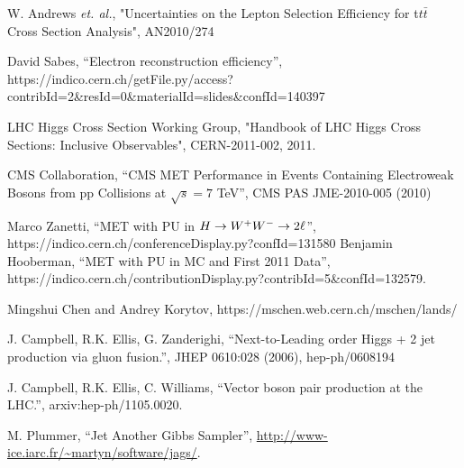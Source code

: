 W. Andrews {\it et. al.}, "Uncertainties on the Lepton Selection Efficiency for t$t\bar{t}$ Cross Section Analysis", AN2010/274

David Sabes, ``Electron reconstruction efficiency'', https://indico.cern.ch/getFile.py/access?contribId=2\&resId=0\&materialId=slides\&confId=140397

LHC Higgs Cross Section Working Group, "Handbook of LHC Higgs Cross Sections: 
Inclusive Observables", CERN-2011-002, 2011.

CMS Collaboration, ``CMS MET Performance in Events Containing Electroweak Bosons from pp Collisions at $\sqrt{s}=7$ TeV'', CMS PAS JME-2010-005 (2010)


Marco Zanetti, ``MET with PU in $H\to W^+W^-\to2\ell$'', https://indico.cern.ch/conferenceDisplay.py?confId=131580
Benjamin Hooberman, ``MET with PU in MC and First 2011 Data'', https://indico.cern.ch/contributionDisplay.py?contribId=5\&confId=132579. 


Mingshui Chen and Andrey Korytov, https://mschen.web.cern.ch/mschen/lands/

J. Campbell, R.K. Ellis, G. Zanderighi, ``Next-to-Leading order Higgs + 2 jet production via gluon fusion.'', JHEP 0610:028 (2006), hep-ph/0608194

J. Campbell, R.K. Ellis, C. Williams, ``Vector boson pair production at the LHC.'', arxiv:hep-ph/1105.0020.

M. Plummer, ``Jet Another Gibbs Sampler'', \url{http://www-ice.iarc.fr/\~martyn/software/jags/}.

